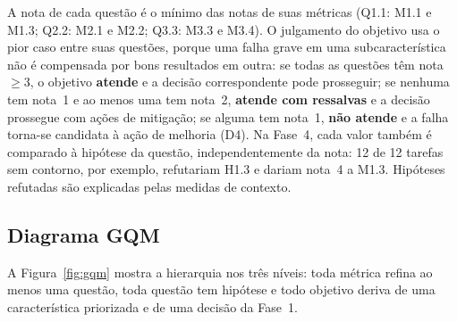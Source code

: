 \documentclass[12pt]{article}
\begin{document}
A nota de cada questão é o mínimo das notas de suas métricas (Q1.1: M1.1 e M1.3; Q2.2: M2.1 e M2.2; Q3.3: M3.3 e M3.4). O julgamento do objetivo usa o pior caso entre suas questões, porque uma falha grave em uma subcaracterística não é compensada por bons resultados em outra: se todas as questões têm nota $\geq 3$, o objetivo \textbf{atende} e a decisão correspondente pode prosseguir; se nenhuma tem nota~1 e ao menos uma tem nota~2, \textbf{atende com ressalvas} e a decisão prossegue com ações de mitigação; se alguma tem nota~1, \textbf{não atende} e a falha torna-se candidata à ação de melhoria (D4). Na Fase~4, cada valor também é comparado à hipótese da questão, independentemente da nota: 12 de 12 tarefas sem contorno, por exemplo, refutariam H1.3 e dariam nota~4 a M1.3. Hipóteses refutadas são explicadas pelas medidas de contexto.

\subsection{Diagrama GQM}

A Figura~\ref{fig:gqm} mostra a hierarquia nos três níveis: toda métrica refina ao menos uma questão, toda questão tem hipótese e todo objetivo deriva de uma característica priorizada e de uma decisão da Fase~1.
\end{document}
